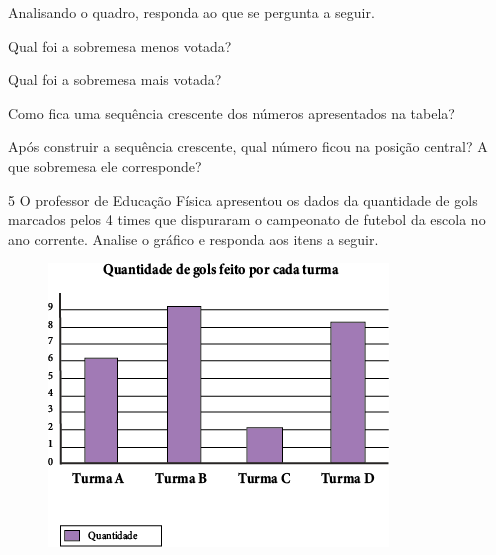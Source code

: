 Analisando o quadro, responda ao que se pergunta a seguir.

\begin{escolha}
\item
  Qual foi a sobremesa menos votada?\\

\item
  Qual foi a sobremesa mais votada?\\

\item
  Como fica uma sequência crescente dos números apresentados na tabela?\\

\item
  Após construir a sequência crescente, qual número ficou na posição
  central? A que sobremesa ele corresponde?\\
\end{escolha}

\pagebreak
\num{5} O professor de Educação Física apresentou os dados da quantidade de gols
marcados pelos 4 times que dispuraram o campeonato de futebol da escola no ano
corrente. Analise o gráfico e responda aos itens a seguir.

\begin{figure}[htpb!]
\centering
\includegraphics[width=.85\textwidth]{media/image44.png}
\end{figure}

